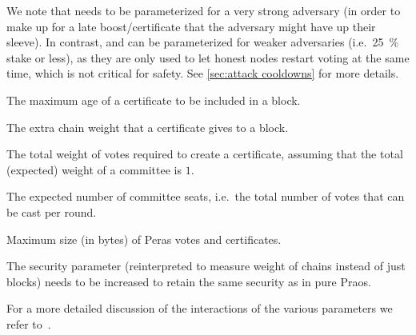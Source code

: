 \begin{description}
  We note that \Theal{} needs to be parameterized for a very strong adversary (in order to make up for a late boost/certificate that the adversary might have up their sleeve).
  In contrast, \Tcq{} and \Tcp{} can be parameterized for weaker adversaries (i.e.~\qty{25}{\percent} stake or less), as they are only used to let honest nodes restart voting at the same time, which is not critical for safety.
  See \cref{sec:attack cooldowns} for more details.
\item[\perasCertMaxRounds]
  The maximum age of a certificate to be included in a block.
\item[\perasBoost]
  The extra chain weight that a certificate gives to a block.
\item[\perasQuorum]
  The total weight of votes required to create a certificate, assuming that the total (expected) weight of a committee is $1$.
\item[\perasN]
  The expected number of committee seats, i.e.\ the total number of votes that can be cast per round.
\item[\perasVoteSizeLimit, \perasCertSizeLimit]
  Maximum size (in bytes) of Peras votes and certificates.
\item[\kcp]
  The security parameter (reinterpreted to measure weight of chains instead of just blocks) needs to be increased to retain the same security as in pure Praos.
\end{description}

For a more detailed discussion of the interactions of the various parameters we refer to~\cite{peras-cip}.

